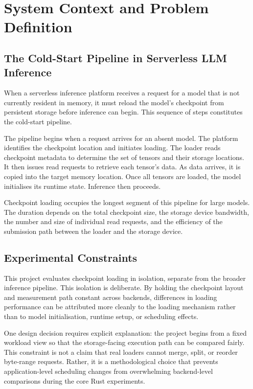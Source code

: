 \chapter{System Context and Problem Definition}
\label{chap:system_context}

\section{The Cold-Start Pipeline in Serverless LLM Inference}

When a serverless inference platform receives a request for a model that is not currently resident in memory, it must reload the model's checkpoint from persistent storage before inference can begin. This sequence of steps constitutes the cold-start pipeline.

The pipeline begins when a request arrives for an absent model. The platform identifies the checkpoint location and initiates loading. The loader reads checkpoint metadata to determine the set of tensors and their storage locations. It then issues read requests to retrieve each tensor's data. As data arrives, it is copied into the target memory location. Once all tensors are loaded, the model initialises its runtime state. Inference then proceeds.

Checkpoint loading occupies the longest segment of this pipeline for large models. The duration depends on the total checkpoint size, the storage device bandwidth, the number and size of individual read requests, and the efficiency of the submission path between the loader and the storage device.

\section{Experimental Constraints}

This project evaluates checkpoint loading in isolation, separate from the broader inference pipeline. This isolation is deliberate. By holding the checkpoint layout and measurement path constant across backends, differences in loading performance can be attributed more cleanly to the loading mechanism rather than to model initialisation, runtime setup, or scheduling effects.

One design decision requires explicit explanation: the project begins from a fixed workload view so that the storage-facing execution path can be compared fairly. This constraint is not a claim that real loaders cannot merge, split, or reorder byte-range requests. Rather, it is a methodological choice that prevents application-level scheduling changes from overwhelming backend-level comparisons during the core Rust experiments.

